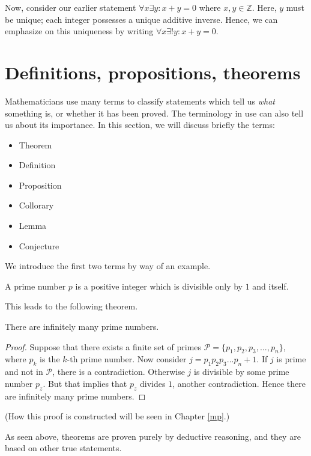 Now, consider our earlier statement $\forall x \exists y : x + y = 0$ where $x,y\in\mathbb{Z}$. Here, $y$ must be unique; each integer
possesses a unique additive inverse. Hence, we can emphasize on this uniqueness by writing $\forall x \exists! y :
x + y = 0$.

\newpage

\section{Definitions, propositions, theorems}
Mathematicians use many terms to classify statements which tell us \textit{what}
something is, or whether it has been proved. The terminology in use can also tell us about its
importance. In this section, we will discuss briefly the terms:
\begin{itemize}
    \item Theorem
    \item Definition
    \item Proposition
    \item Collorary
    \item Lemma
    \item Conjecture
\end{itemize}

We introduce the first two terms by way of an example.
\begin{definition}
    A prime number $p$ is a positive integer which is divisible only by $1$ and itself.
\end{definition}

This leads to the following theorem.

\begin{theorem}[Euclid]
    There are infinitely many prime numbers.
\end{theorem}
\begin{proof}
    Suppose that there exists a finite set of primes $\mathcal{P} = \{p_1,p_2,p_3,...,p_n\}$,
    where $p_k$ is the $k$-th prime number. Now consider $j = p_1 p_2 p_3 ... p_n + 1$. If $j$ is prime
    and not in $\mathcal{P}$, there is a contradiction. Otherwise $j$ is divisible by some prime number $p_z$.
    But that implies that $p_z$ divides $1$, another contradiction. Hence there are infinitely many prime numbers.
\end{proof}

(How this proof is constructed will be seen in Chapter \ref{mp}.)

As seen above, theorems are proven purely by deductive reasoning, and they are based on other true
statements.

